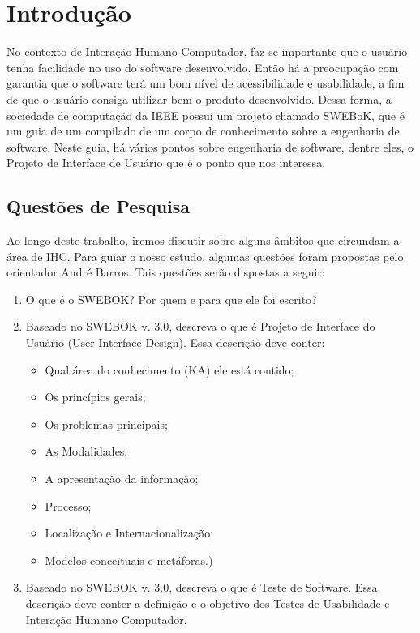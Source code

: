\chapter[Introdução]{Introdução}

No contexto de Interação Humano Computador, faz-se importante que o usuário tenha
facilidade no uso do software desenvolvido. Então há a preocupação com garantia
que o software terá um bom nível de acessibilidade e usabilidade, a fim de que o
usuário consiga utilizar bem o produto desenvolvido. Dessa forma, a sociedade de
computação da IEEE  possui um projeto chamado SWEBoK, que é um guia de um compilado
de um corpo de conhecimento sobre a engenharia de software. Neste guia, há vários
pontos sobre engenharia de software, dentre eles, o Projeto de Interface de Usuário
que é o ponto que nos interessa.

\section[Questões de Pesquisa]{Questões de Pesquisa}
Ao longo deste trabalho, iremos discutir sobre alguns âmbitos que circundam a área
de IHC. Para guiar o nosso estudo, algumas questões foram propostas pelo orientador
André Barros. Tais questões serão dispostas a seguir:

\begin{enumerate}
    \item O que é o SWEBOK? Por quem e para que ele foi escrito?
    \item Baseado no SWEBOK v. 3.0, descreva o que é Projeto de Interface do
        Usuário (User Interface Design). Essa descrição deve conter:
        \begin{itemize}
            \item Qual área do conhecimento (KA) ele está contido;

            \item Os princípios gerais;

            \item Os problemas principais;

            \item As Modalidades;

            \item A apresentação da informação;

            \item Processo;

            \item Localização e Internacionalização;

            \item Modelos conceituais e metáforas.)
        \end{itemize}
    \item Baseado no SWEBOK v. 3.0, descreva o que é Teste de Software.
        Essa descrição deve conter a definição e o objetivo dos Testes de
        Usabilidade e Interação Humano Computador.
\end{enumerate}
